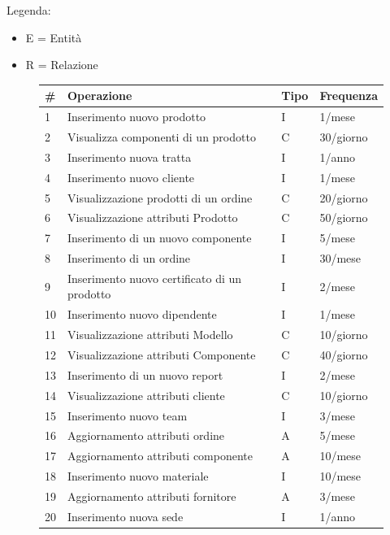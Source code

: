 \documentclass{article}
\begin{document}
Legenda:
\begin{itemize}
    \item E = Entità
    \item R = Relazione
\end{itemize}

\begin{figure}[H]
    \centering
    \begin{tabular}{|l|l|l|l|}
        \hline
        \textbf{\#} & \textbf{Operazione} & \textbf{Tipo} & \textbf{Frequenza} \\
        \hline
        1  & Inserimento nuovo prodotto & I & 1/mese \\
        2  & Visualizza componenti di un prodotto & C & 30/giorno \\
        3  & Inserimento nuova tratta & I & 1/anno \\
        4  & Inserimento nuovo cliente & I & 1/mese \\
        5  & Visualizzazione prodotti di un ordine & C & 20/giorno \\
        6  & Visualizzazione attributi Prodotto & C & 50/giorno \\
        7  & Inserimento di un nuovo componente & I & 5/mese \\
        8  & Inserimento di un ordine & I & 30/mese \\
        9  & Inserimento nuovo certificato di un prodotto & I & 2/mese \\
        10 & Inserimento nuovo dipendente & I & 1/mese \\
        11 & Visualizzazione attributi Modello & C & 10/giorno \\
        12 & Visualizzazione attributi Componente & C & 40/giorno \\
        13 & Inserimento di un nuovo report & I & 2/mese \\
        14 & Visualizzazione attributi cliente & C & 10/giorno \\
        15 & Inserimento nuovo team & I & 3/mese \\
        16 & Aggiornamento attributi ordine & A & 5/mese \\
        17 & Aggiornamento attributi componente & A & 10/mese \\
        18 & Inserimento nuovo materiale & I & 10/mese \\
        19 & Aggiornamento attributi fornitore & A & 3/mese \\
        20 & Inserimento nuova sede & I & 1/anno \\

\end{tabular}
\end{figure}
\end{document}
